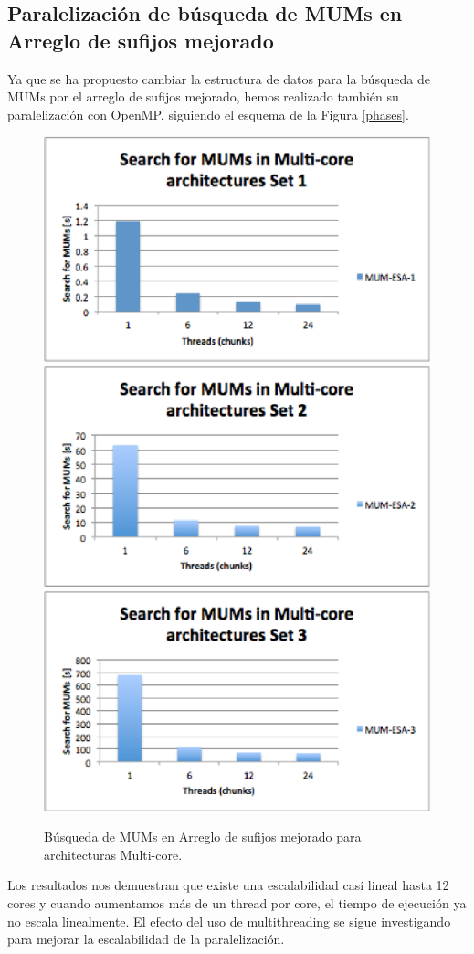 \documentclass[12pt,a4paper]{article}
\begin{document}
\subsection{Paralelización de búsqueda de MUMs en Arreglo de sufijos mejorado}
Ya que se ha propuesto cambiar la estructura de datos para la búsqueda de MUMs por el arreglo de sufijos mejorado, hemos realizado también su paralelización con OpenMP, siguiendo el esquema de la Figura \ref{phases}.
 \begin{figure}[h] 
   \centering 
   \includegraphics[scale=0.5]{esa1.eps} 
   \includegraphics[scale=0.5]{esa2.eps} 
   \includegraphics[scale=0.5]{esa3.eps} 
  \caption{Búsqueda de MUMs en Arreglo de sufijos mejorado para architecturas Multi-core.} 
   \label{fig:stmc} 
 \end{figure}
Los resultados nos demuestran que existe una escalabilidad casí lineal hasta 12 cores y cuando aumentamos más de un thread por core, el tiempo de ejecución ya no escala linealmente. El efecto del uso de multithreading se sigue investigando para mejorar la escalabilidad de la paralelizaci\'on.
\end{document}
